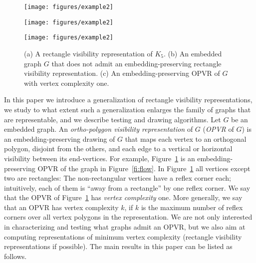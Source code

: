 \documentclass{article}
\newcommand{\opvr}{OPVR\xspace}
\begin{document}
\begin{figure}[tb]
    \centering
    \begin{minipage}[b]{.3\textwidth}
    	\centering
    	\texttt{[image: figures/example2]}
    	\subcaption{}\label{fi:rvr}
    \end{minipage}
    \hfil
    \begin{minipage}[b]{.3\textwidth}
    	\centering
    	\texttt{[image: figures/example2]}
    	\subcaption{}\label{fi:flow}
    \end{minipage}
    \hfil
    \begin{minipage}[b]{.3\textwidth}
    	\centering
    	\texttt{[image: figures/example2]}
    	\subcaption{}\label{fi:opvr}
    \end{minipage}
    \caption{(a) A rectangle visibility representation of $K_5$. (b) An embedded graph $G$ that does not admit an embedding-preserving rectangle visibility representation. (c) An embedding-preserving \opvr of $G$ with vertex complexity one.}
\end{figure}

In this paper we introduce a generalization of rectangle visibility representations, we study to what extent such a generalization enlarges the family of graphs that are representable, and we describe testing and drawing algorithms. Let $G$ be an embedded graph. An \emph{ortho-polygon visibility representation} of  $G$ (\emph{\opvr} of $G$) is an embedding-preserving drawing of $G$ that maps each vertex to an orthogonal polygon, disjoint from the others, and each edge to a vertical or horizontal visibility between its end-vertices. For example, Figure~\ref{fi:opvr} is an embedding-preserving \opvr of the graph in Figure~\ref{fi:flow}.
In Figure~\ref{fi:opvr} all vertices except two are rectangles: The non-rectangular vertices have a reflex corner each; intuitively, each of them is ``away from a rectangle'' by one reflex corner. We say that the \opvr of Figure~\ref{fi:opvr} has \emph{vertex complexity} one. More  generally, we say that an \opvr has vertex complexity $k$, if $k$ is the maximum number of reflex corners over all vertex polygons in the representation.
We are not only interested in characterizing and testing what graphs admit an \opvr, but we also aim at computing representations of minimum vertex complexity (rectangle visibility representations if possible).
The main results in this paper can be listed as follows.
\end{document}
